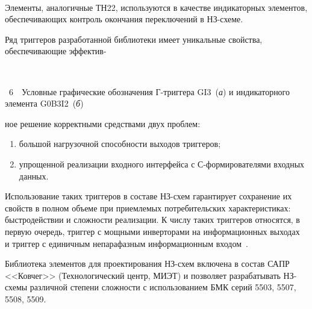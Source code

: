 \begin{multicols}{2}
   
      

      \setcounter{figure}{6}
      \begin{figure*}[b] %
 \begin{center}
 \mbox{%
 \epsfxsize=159.239mm
 }
 \end{center}
 \vspace*{-9pt}
\end{figure*}
       
       Элементы, аналогичные ТН22, используются в качестве индикаторных элементов, 
обеспечивающих контроль окончания переключений в НЗ-схеме. 
       
       Ряд триггеров разработанной библиотеки имеет уникальные свойства, 
обеспечивающие эффектив-\linebreak

\setcounter{figure}{5} \noindent
\begin{center}  %
\mbox{%
 \epsfxsize=72.876mm
 }
  \end{center}

  \vspace*{-3pt}

\noindent
{{\figurename~6}\ \ \small{Условные графические обозначения Г-триг\-ге\-ра GI3~(\textit{а})
       и индикаторного элемента G0B3I2~(\textit{б})}}

\vspace*{12pt}

\setcounter{figure}{7}
      
\noindent
ное решение корректными средствами двух проб\-лем:
       \begin{enumerate}[(1)]
\item большой нагрузочной способности выходов триггеров;
\item упрощенной реализации входного интерфейса с С-фор\-ми\-ро\-ва\-те\-ля\-ми 
входных данных.
\end{enumerate}
Использование таких триггеров в составе НЗ-схем гарантирует сохранение их 
свойств в полном объеме при приемлемых потребительских характеристиках: быстродействии 
и сложности реализации. К числу таких триггеров относятся, в первую очередь, триггер с 
мощными инверторами на информационных выходах~\cite{72-sok} и триггер с единичным 
непарафазным информационным входом~\cite{48-sok}.
       
       Библиотека элементов для проектирования НЗ-схем включена в состав САПР 
<<Ковчег>> (Технологический центр, МИЭТ) и позволяет разрабатывать НЗ-схе\-мы 
различной степени сложности с использованием БМК 
серий 5503, 5507, 5508, 5509.


\end{multicols}
